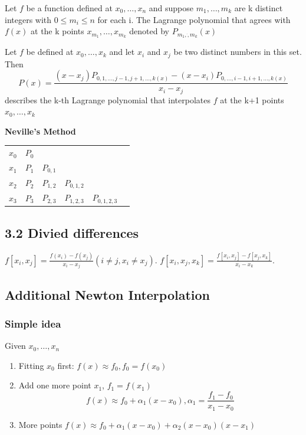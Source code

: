 \documentclass[11pt]{article}
\begin{document}
\begin{definition}
Let $f$ be a function defined at $x_0,\dots,x_n$ and suppose $m_1,\dots,m_k$ are
k distinct integers with $0\le m_i\le n$ for each i. The Lagrange polynomial that
agrees with $f(x)$ at the k points $x_{m_1},\dots,x_{m_k}$ denoted by 
$P_{m_1,\dot,m_k}(x)$
\end{definition}

\begin{theorem}
Let $f$ be defined at $x_0,\dots,x_k$ and let $x_i$ and $x_j$ be two distinct numbers in
this set. Then
\begin{equation*}
P(x)=\frac{(x-x_j)P_{0,1,\dots,j-1,j+1,\dots,k(x)}-(x-x_i)P_{0,\dots,i-1,i+1,\dots,k(x)}}
{x_i-x_j}
\end{equation*}
describes the k-th Lagrange polynomial that interpolates $f$ at the k+1 points
$x_0,\dots,x_k$
\end{theorem}

\textbf{Neville's Method}
\begin{tabular}{c c c c c c}
$x_0$ & $P_0$ &           &             &            \\
$x_1$ & $P_1$ & $P_{0,1}$ &             &            \\
$x_2$ & $P_2$ & $P_{1,2}$ & $P_{0,1,2}$ &            \\
$x_3$ & $P_3$ & $P_{2,3}$ & $P_{1,2,3}$ & $P_{0,1,2,3}$\\
\end{tabular}
\subsection{3.2 Divied differences}
\label{sec:orgcf80581}
\(f[x_i,x_j]=\frac{f(x_i)-f(x_j)}{x_i-x_j}(i\neq j, x_i\neq x_j)\).
\(f[x_i,x_j,x_k]=\frac{f[x_i,x_j]-f[x_j,x_k]}{x_i-x_k}\).
\subsection{Additional Newton Interpolation}
\label{sec:orgf3e1340}
\subsubsection{Simple idea}
\label{sec:orgcefd3e5}
Given \(x_0,\dots,x_n\)
\begin{enumerate}
\item Fitting $x_0$ first: $f(x)\approx f_0, f_0=f(x_0)$
\item Add one more point $x_1$, $f_1=f(x_1)$
\begin{equation*}
f(x) \approx f_0+\alpha_1(x-x_0),\alpha_1=\frac{f_1-f_0}{x_1-x_0}
\end{equation*}
\item More points $f(x)\approx f_0+\alpha_1(x-x_0)+\alpha_2(x-x_0)(x-x_1)$
\end{enumerate}
\end{document}
